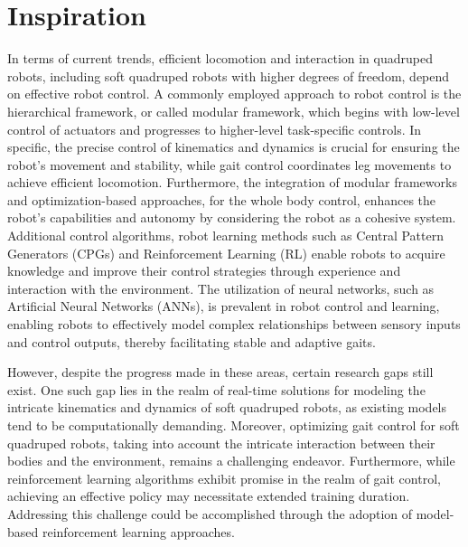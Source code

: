 

\section{Inspiration}
In terms of current trends, efficient locomotion and interaction in quadruped robots, including soft quadruped robots with higher degrees of freedom, depend on effective robot control. A commonly employed approach to robot control is the hierarchical framework, or called modular framework, which begins with low-level control of actuators and progresses to higher-level task-specific controls. In specific, the precise control of kinematics and dynamics is crucial for ensuring the robot's movement and stability, while gait control coordinates leg movements to achieve efficient locomotion. Furthermore, the integration of modular frameworks and optimization-based approaches, for the whole body control, enhances the robot's capabilities and autonomy by considering the robot as a cohesive system. Additional control algorithms, robot learning methods such as Central Pattern Generators (CPGs) and Reinforcement Learning (RL) enable robots to acquire knowledge and improve their control strategies through experience and interaction with the environment. The utilization of neural networks, such as Artificial Neural Networks (ANNs), is prevalent in robot control and learning, enabling robots to effectively model complex relationships between sensory inputs and control outputs, thereby facilitating stable and adaptive gaits.

However, despite the progress made in these areas, certain research gaps still exist. One such gap lies in the realm of real-time solutions for modeling the intricate kinematics and dynamics of soft quadruped robots, as existing models tend to be computationally demanding. Moreover, optimizing gait control for soft quadruped robots, taking into account the intricate interaction between their bodies and the environment, remains a challenging endeavor. Furthermore, while reinforcement learning algorithms exhibit promise in the realm of gait control, achieving an effective policy may necessitate extended training duration. Addressing this challenge could be accomplished through the adoption of model-based reinforcement learning approaches.


